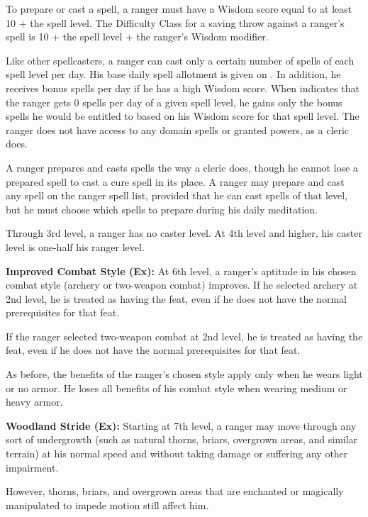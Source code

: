 To prepare or cast a spell, a ranger must have a Wisdom score equal to at least 10 + the spell level. The Difficulty Class for a saving throw against a ranger's spell is 10 + the spell level + the ranger's Wisdom modifier.

Like other spellcasters, a ranger can cast only a certain number of spells of each spell level per day. His base daily spell allotment is given on . In addition, he receives bonus spells per day if he has a high Wisdom score. When  indicates that the ranger gets 0 spells per day of a given spell level, he gains only the bonus spells he would be entitled to based on his Wisdom score for that spell level. The ranger does not have access to any domain spells or granted powers, as a cleric does.

A ranger prepares and casts spells the way a cleric does, though he cannot lose a prepared spell to cast a cure spell in its place. A ranger may prepare and cast any spell on the ranger spell list, provided that he can cast spells of that level, but he must choose which spells to prepare during his daily meditation.

Through 3rd level, a ranger has no caster level. At 4th level and higher, his caster level is one-half his ranger level.

\textbf{Improved Combat Style (Ex):} At 6th level, a ranger's aptitude in his chosen combat style (archery or two-weapon combat) improves. If he selected archery at 2nd level, he is treated as having the  feat, even if he does not have the normal prerequisites for that feat.

If the ranger selected two-weapon combat at 2nd level, he is treated as having the  feat, even if he does not have the normal prerequisites for that feat.

As before, the benefits of the ranger's chosen style apply only when he wears light or no armor. He loses all benefits of his combat style when wearing medium or heavy armor.

\textbf{Woodland Stride (Ex):} Starting at 7th level, a ranger may move through any sort of undergrowth (such as natural thorns, briars, overgrown areas, and similar terrain) at his normal speed and without taking damage or suffering any other impairment.

However, thorns, briars, and overgrown areas that are enchanted or magically manipulated to impede motion still affect him.

